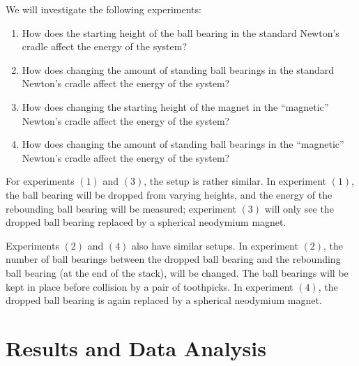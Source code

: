\documentclass[aip,jmp,amsmath,amssymb,reprint,author-numerical]{revtex4-1}
\begin{document}
        We will investigate the following experiments:
        \begin{enumerate}
            \item How does the starting height of the ball bearing in the standard Newton's cradle
                affect the energy of the system?
            \item How does changing the amount of standing ball bearings in the standard Newton's cradle
                affect the energy of the system?
            \item How does changing the starting height of the magnet in the ``magnetic'' Newton's
                cradle affect the energy of the system?
            \item How does changing the amount of standing ball bearings in the ``magnetic'' Newton's
                cradle affect the energy of the system?
        \end{enumerate}

        For experiments $(1)$ and $(3)$, the setup is rather similar. In experiment $(1)$, the ball
        bearing will be dropped from varying heights, and the energy of the rebounding ball bearing
        will be measured; experiment $(3)$ will only see the dropped ball bearing replaced by a
        spherical neodymium magnet.

        Experiments $(2)$ and $(4)$ also have similar setups. In experiment $(2)$, the number of ball
        bearings between the dropped ball bearing and the rebounding ball bearing (at the end of the
        stack), will be changed. The ball bearings will be kept in place before collision by a pair of
        toothpicks. In experiment $(4)$, the dropped ball bearing is again replaced by a spherical
        neodymium magnet.


    \section{\label{sec:result}Results and Data Analysis}
\end{document}
